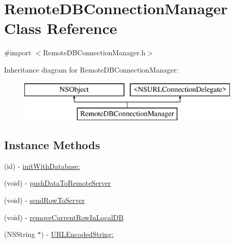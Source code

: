 \hypertarget{interface_remote_d_b_connection_manager}{\section{Remote\-D\-B\-Connection\-Manager Class Reference}
\label{interface_remote_d_b_connection_manager}
}


{\ttfamily \#import $<$Remote\-D\-B\-Connection\-Manager.\-h$>$}

Inheritance diagram for Remote\-D\-B\-Connection\-Manager\-:\begin{figure}[H]
\begin{center}
\leavevmode
\includegraphics[height=2.000000cm]{interface_remote_d_b_connection_manager}
\end{center}
\end{figure}
\subsection*{Instance Methods}
\begin{DoxyCompactItemize}
\item 
(id) -\/ \hyperlink{interface_remote_d_b_connection_manager_a744cbe8cedf02655ce5a2311957059cb}{init\-With\-Database\-:}
\item 
(void) -\/ \hyperlink{interface_remote_d_b_connection_manager_a517a86ad693e383d664972123808b9fc}{push\-Data\-To\-Remote\-Server}
\item 
(void) -\/ \hyperlink{interface_remote_d_b_connection_manager_aa7263ee167de6993f3c68d74f34d3b9e}{send\-Row\-To\-Server}
\item 
(void) -\/ \hyperlink{interface_remote_d_b_connection_manager_a87140c7af270366183486e2f02dc6f5d}{remove\-Current\-Row\-In\-Local\-D\-B}
\item 
(N\-S\-String $\ast$) -\/ \hyperlink{interface_remote_d_b_connection_manager_a56943f27947c97c9c0d88bf3f89a73f6}{U\-R\-L\-Encoded\-String\-:}
\end{DoxyCompactItemize}

